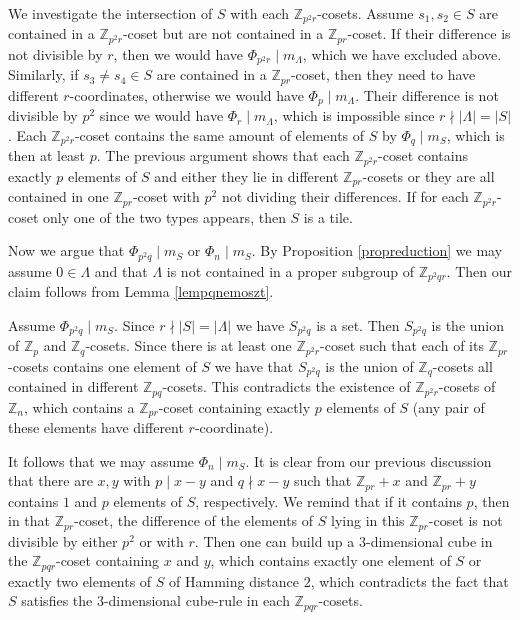 \documentclass[10pt]{article}
\newcommand{\Z}{\mathbb{Z}}
\newcommand{\La}{\Lambda}
\begin{document}
        We investigate the intersection of $S$ with each $\Z_{p ^2r}$-cosets. Assume $s_1,s_2 \in S$ are contained in a $\Z_{p ^2r}$-coset but are not contained in a $\Z_{pr}$-coset.
        If their difference is not divisible by $r$, then we would have $\Phi_{p^2r} \mid m_{\La}$, which we have excluded above. 
        Similarly, if $s_3 \ne s_4 \in S$ are contained in a $\Z_{pr}$-coset, then they need to have different $r$-coordinates, otherwise we would have $\Phi_p \mid m_{\La}$.
        Their difference is not divisible by $p^2$ since we would have $\Phi_r \mid m_{\La}$, which is impossible since $r \nmid |\La|=|S|$.
        Each $\Z_{p^2r}$-coset contains the same amount of elements of $S$ by $\Phi_q \mid m_S$, which is then at least $p$. The previous argument shows that each $\Z_{p^2r}$-coset contains exactly $p$  elements of $S$ and either they lie in different $\Z_{pr}$-cosets or they are all contained in one $\Z_{pr}$-coset with $p^2$ not dividing their differences.
        If for each  $\Z_{p^2r}$-coset only one of the two types appears, then $S$ is a tile. 
        
        Now we argue that $\Phi_{p^2q} \mid m_S$ or $\Phi_{n} \mid m_S$. By Proposition \ref{propreduction} we may assume $0 \in \La$ and that $\La$ is not contained in a proper subgroup of $\Z_{p^2qr}$. Then our claim follows from Lemma \ref{lempqnemoszt}.
        
         Assume  $\Phi_{p^2q} \mid m_S$. Since $r \nmid |S|=|\La|$ we have $S_{p^2q}$ is a set. Then $S_{p^2q}$ is the union of $\Z_p$ and $\Z_q$-cosets. 
        Since there is at least one $\Z_{p^2r}$-coset such that each of its $\Z_{pr}$-cosets contains one element of $S$ we have that $S_{p^2q}$ is the union of $\Z_q$-cosets all contained in different $\Z_{pq}$-cosets.
        This contradicts the existence of $\Z_{p^2r}$-cosets of $\Z_{n}$, which contains a $\Z_{pr}$-coset containing exactly $p$ elements of $S$ (any pair of these elements have different $r$-coordinate).
        
        It follows that we may assume $\Phi_{n} \mid m_S$. It is clear from our previous discussion that there are $x,y$ with $p \mid x-y$ and $q \nmid x-y$ such that $\Z_{pr}+x$ and $\Z_{pr}+y$ 
        contains $1$ and $p$ elements of $S$, respectively. 
        We remind that if it contains $p$, then in that $\Z_{pr}$-coset, the  difference of the elements of $S$ lying in this $\Z_{pr}$-coset is not divisible by either $p^2$ or with $r$.
        Then one can build up a $3$-dimensional cube in the $\Z_{pqr}$-coset containing $x$ and $y$, which contains exactly one element of $S$ or exactly two elements of $S$ of Hamming distance $2$, which contradicts the fact that $S$ satisfies the $3$-dimensional cube-rule in each $\Z_{pqr}$-cosets. 
        
\end{document}
